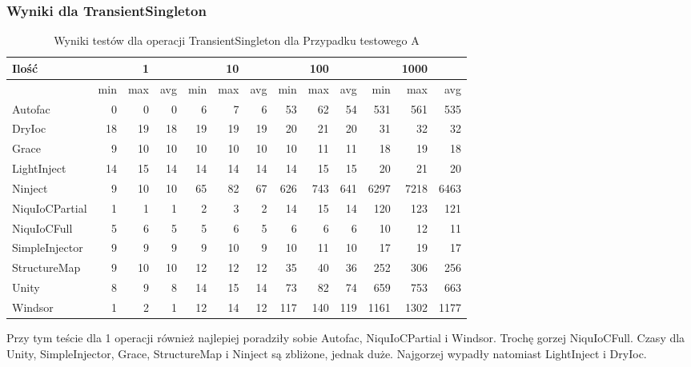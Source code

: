 \documentclass[12pt]{article}
\begin{document}
\subsubsection{Wyniki dla TransientSingleton}
\begin{table}[H]
\captionsetup{belowskip=0pt,aboveskip=0pt}
\begin{center}
\begin{small}
	\begin{tabular}{ | l | r r r | r r r | r r r | r r r | }
    		\hline
Ilość & & 1 & & & 10 & & & 100 & & & 1000 & \\ \hline
 & min & max & avg & min & max & avg & min & max & avg & min & max & avg \\ \hline
Autofac & 0 & 0 & 0 & 6 & 7 & 6 & 53 & 62 & 54 & 531 & 561 & 535 \\ \hline
DryIoc & 18 & 19 & 18 & 19 & 19 & 19 & 20 & 21 & 20 & 31 & 32 & 32 \\ \hline
Grace & 9 & 10 & 10 & 10 & 10 & 10 & 10 & 11 & 11 & 18 & 19 & 18 \\ \hline
LightInject & 14 & 15 & 14 & 14 & 14 & 14 & 14 & 15 & 15 & 20 & 21 & 20 \\ \hline
Ninject & 9 & 10 & 10 & 65 & 82 & 67 & 626 & 743 & 641 & 6297 & 7218 & 6463 \\ \hline
NiquIoCPartial & 1 & 1 & 1 & 2 & 3 & 2 & 14 & 15 & 14 & 120 & 123 & 121 \\ \hline
NiquIoCFull & 5 & 6 & 5 & 5 & 6 & 5 & 6 & 6 & 6 & 10 & 12 & 11 \\ \hline
SimpleInjector & 9 & 9 & 9 & 9 & 10 & 9 & 10 & 11 & 10 & 17 & 19 & 17 \\ \hline
StructureMap & 9 & 10 & 10 & 12 & 12 & 12 & 35 & 40 & 36 & 252 & 306 & 256 \\ \hline
Unity & 8 & 9 & 8 & 14 & 15 & 14 & 73 & 82 & 74 & 659 & 753 & 663 \\ \hline
Windsor & 1 & 2 & 1 & 12 & 14 & 12 & 117 & 140 & 119 & 1161 & 1302 & 1177 \\ \hline
  	\end{tabular}
\end{small}
\end{center}
\caption{Wyniki testów dla operacji TransientSingleton dla Przypadku testowego A}
\label{TestCaseA_TransientSingleton}
\end{table}
Przy tym teście dla 1 operacji również najlepiej poradziły sobie Autofac, NiquIoCPartial i Windsor. Trochę gorzej NiquIoCFull. Czasy dla Unity, SimpleInjector, Grace, StructureMap i Ninject są zbliżone, jednak duże. Najgorzej wypadły natomiast LightInject i DryIoc.\\
\end{document}
